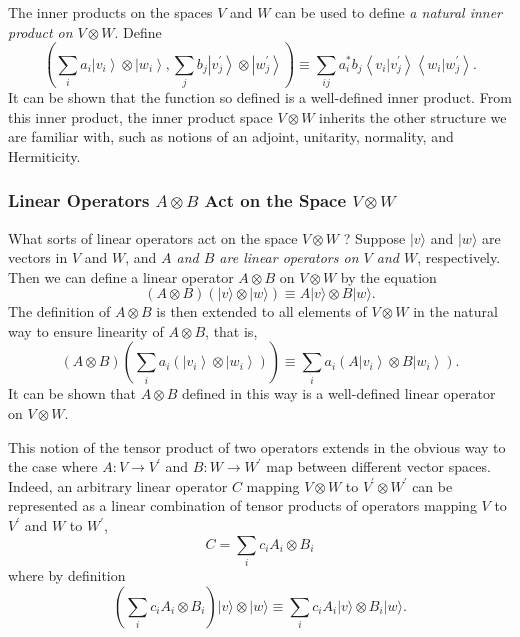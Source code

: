 The inner products on the spaces $V$ and $W$ can be used to define \textit{a natural inner product on $V \otimes W$}. Define
\begin{equation}
    \left(\sum_{i} a_{i}\left|v_{i}\right\rangle \otimes\left|w_{i}\right\rangle, \sum_{j} b_{j}\left|v_{j}^{\prime}\right\rangle \otimes\left|w_{j}^{\prime}\right\rangle\right) \equiv \sum_{i j} a_{i}^{*} b_{j}\left\langle v_{i} | v_{j}^{\prime}\right\rangle\left\langle w_{i} | w_{j}^{\prime}\right\rangle.
\end{equation}
It can be shown that the function so defined is a well-defined inner product. From this inner product, the inner product space $V \otimes W$ inherits the other structure we are familiar with, such as notions of an adjoint, unitarity, normality, and Hermiticity.

\subsubsection{Linear Operators $A \otimes B$ Act on the Space $V \otimes W$}

What sorts of linear operators act on the space $V \otimes W$ ? Suppose $|v\rangle$ and $|w\rangle$ are vectors in $V$ and $W$, and \textit{$A$ and $B$ are linear operators on $V$ and $W$}, respectively. Then we can define a linear operator $A \otimes B$ on $V \otimes W$ by the equation
\begin{equation}
    (A \otimes B)(|v\rangle \otimes|w\rangle) \equiv A|v\rangle \otimes B|w\rangle.
\end{equation}
The definition of $A \otimes B$ is then extended to all elements of $V \otimes W$ in the natural way to ensure linearity of $A \otimes B$, that is,
\begin{equation}
    (A \otimes B)\left(\sum_{i} a_{i} \left(\left|v_{i}\right\rangle \otimes\left|w_{i}\right\rangle\right) \right)  \equiv \sum_{i} a_{i} \left( A\left|v_{i}\right\rangle \otimes B\left|w_{i}\right\rangle \right) .
\end{equation}
It can be shown that $A \otimes B$ defined in this way is a well-defined linear operator on $V \otimes W$. 

This notion of the tensor product of two operators extends in the obvious way to the case where $A: V \rightarrow V^{\prime}$ and $B: W \rightarrow W^{\prime}$ map between different vector spaces. Indeed, an arbitrary linear operator $C$ mapping $V \otimes W$ to $V^{\prime} \otimes W^{\prime}$ can be represented as a linear combination of tensor products of operators mapping $V$ to $V^{\prime}$ and $W$ to $W^{\prime}$,
\begin{equation}
    C=\sum_{i} c_{i} A_{i} \otimes B_{i}
\end{equation}
where by definition
\begin{equation}
    \left(\sum_{i} c_{i} A_{i} \otimes B_{i}\right)|v\rangle \otimes|w\rangle \equiv \sum_{i} c_{i} A_{i}|v\rangle \otimes B_{i}|w\rangle .
\end{equation}

